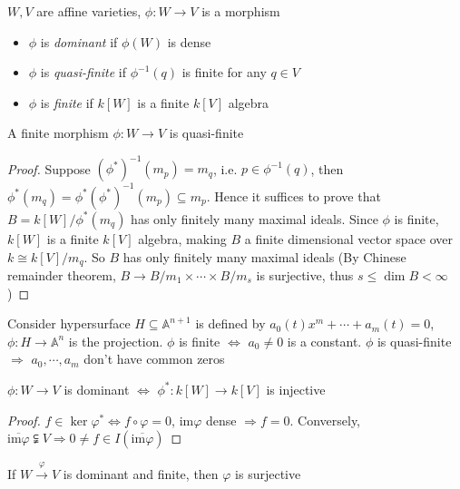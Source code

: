 \documentclass[main]{subfiles}
\begin{document}
\begin{definition}
$W,V$ are affine varieties, $\phi:W\to V$ is a morphism
\begin{itemize}
\item $\phi$ is \textit{dominant} if $\phi(W)$ is dense
\item $\phi$ is \textit{quasi-finite} if $\phi^{-1}(q)$ is finite for any $q\in V$
\item $\phi$ is \textit{finite} if $k[W]$ is a finite $k[V]$ algebra
\end{itemize}
\end{definition}

\begin{lemma}
A finite morphism $\phi:W\to V$ is quasi-finite
\end{lemma}

\begin{proof}
Suppose $(\phi^*)^{-1}(m_p)=m_q$, i.e. $p\in\phi^{-1}(q)$, then $\phi^*(m_q)=\phi^*(\phi^*)^{-1}(m_p)\subseteq m_p$. Hence it suffices to prove that $B=k[W]/\phi^*(m_q)$ has only finitely many maximal ideals. Since $\phi$ is finite, $k[W]$ is a finite $k[V]$ algebra, making $B$ a finite dimensional vector space over $k\cong k[V]/m_q$. So $B$ has only finitely many maximal ideals (By Chinese remainder theorem, $B\to B/m_1\times\cdots \times B/m_s$ is surjective, thus $s\leq\dim B<\infty$)
\end{proof}

\begin{exercise}
Consider hypersurface $H\subseteq\mathbb A^{n+1}$ is defined by $a_0(t)x^m+\cdots+a_m(t)=0$, $\phi:H\to\mathbb A^n$ is the projection. $\phi$ is finite $\iff$ $a_0\neq 0$ is a constant. $\phi$ is quasi-finite $\Rightarrow$ $a_0,\cdots, a_m$ don't have common zeros
\end{exercise}

\begin{lemma}
$\phi:W\to V$ is dominant $\iff$ $\phi^*:k[W]\to k[V]$ is injective
\end{lemma}

\begin{proof}
$f\in\ker\varphi^*\Leftrightarrow f\circ\varphi=0$, $\mathrm{im}\varphi$ dense $\Rightarrow f=0$. Conversely, $\overline{\mathrm{im}\varphi}\subsetneqq V\Rightarrow 0\neq f\in I(\overline{\mathrm{im}\varphi})$
\end{proof}

\begin{proposition}
If $W\xrightarrow{\varphi}V$ is dominant and finite, then $\varphi$ is surjective
\end{proposition}
\end{document}
